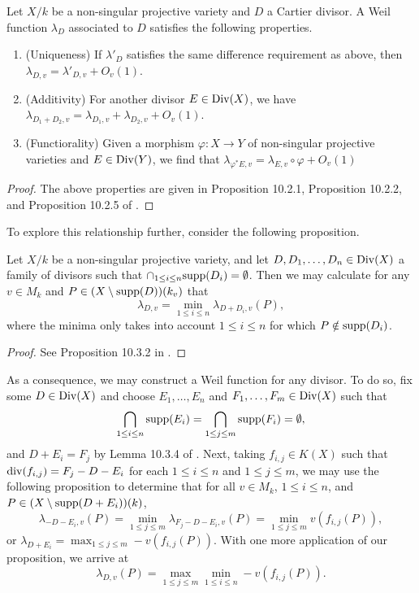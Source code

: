 \begin{theorem}
    Let $X/k$ be a non-singular projective variety and $D$ a Cartier divisor.
    A Weil function $\lambda_D$ associated to $D$ satisfies the following properties.
    \begin{enumerate}
        \item (Uniqueness)
        If $\lambda'_D$ satisfies the same difference requirement as above,
        then $\lambda_{D,v} = \lambda'_{D,v} + O_v(1)$.

        \item (Additivity)
        For another divisor $E \in {\rm Div}(X)$, we have $\lambda_{D_1 + D_2, v} = \lambda_{D_1, v} + \lambda_{D_2, v} + O_v(1)$.

        \item (Functiorality)
        Given a morphism $\varphi: X \to Y$ of non-singular projective varieties and $E \in {\rm Div}(Y)$,
        we find that $\lambda_{\varphi^* E, v} = \lambda_{E, v} \circ \varphi + O_v(1)$
    \end{enumerate}
\end{theorem}

\begin{proof}
    The above properties are given in Proposition 10.2.1, Proposition 10.2.2, and Proposition 10.2.5 of \cite{Lang_2013}.
\end{proof}

To explore this relationship further, consider the following proposition.

\begin{proposition}
    Let $X/k$ be a non-singular projective variety,
    and let $D, D_1, \ldots, D_n \in {\rm Div}(X)$ a family of divisors such that $\cap_{1 \leq i \leq n} {\rm supp}(D_i) = \emptyset$.
    Then we may calculate for any $v \in M_k$ and $P \in (X \setminus {\rm supp}(D))(k_v)$ that
    \[
        \lambda_{D, v} = \min_{1 \leq i \leq n} \lambda_{D + D_i, v}(P),
    \]
    where the minima only takes into account $1 \leq i \leq n$ for which $P \notin {\rm supp}(D_i)$. 
\end{proposition}

\begin{proof}
    See Proposition 10.3.2 in \cite{Lang_2013}.
\end{proof}

As a consequence, we may construct a Weil function for any divisor.
To do so, fix some $D \in {\rm Div}(X)$ and choose $E_1, \ldots, E_n$ and $F_1, \ldots, F_m \in {\rm Div}(X)$ such that 
\[
    \bigcap_{1 \leq i \leq n} {\rm supp}(E_i)
    = \bigcap_{1 \leq j \leq m} {\rm supp}(F_i)
    = \emptyset,
\]
and $D + E_i = F_j$ by Lemma 10.3.4 of \cite{Lang_2013}.
Next, taking $f_{i, j} \in K(X)$ such that ${\rm div}(f_{i,j}) = F_j - D - E_i$ for each $1 \leq i \leq n$ and $1 \leq j \leq m$,
we may use the following proposition to determine that for all $v \in M_k$, $1 \leq i \leq n$,  and $P \in (X \setminus {\rm supp}(D + E_i))(k)$,
\[
    \lambda_{-D - E_i, v}(P)
    = \min_{1 \leq j \leq m} \lambda_{F_j - D - E_i, v}(P)
    = \min_{1 \leq j \leq m} v(f_{i,j}(P)),
\]
or $\lambda_{D + E_i} = \max_{1 \leq j \leq m} -v(f_{i,j}(P))$. 
With one more application of our proposition, we arrive at
\[
    \lambda_{D, v}(P)
    = \max_{1 \leq j \leq m} \min_{1 \leq i \leq n} -v(f_{i,j}(P)).
\]


